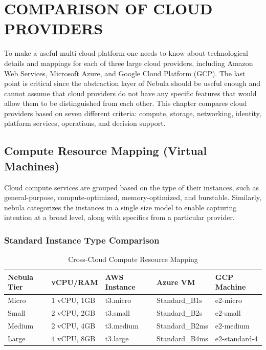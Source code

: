 \chapter{COMPARISON OF CLOUD PROVIDERS}
\thispagestyle{plain}

To make a useful multi-cloud platform one needs to know about technological details and mappings for each of three large cloud providers, including Amazon Web Services, Microsoft Azure, and Google Cloud Platform (GCP). The last point is critical since the abstraction layer of Nebula should be useful enough and cannot assume that cloud providers do not have any specific features that would allow them to be distinguished from each other. This chapter compares cloud providers based on seven different criteria: compute, storage, networking, identity, platform services, operations, and decision support.


\section{Compute Resource Mapping (Virtual Machines)}
Cloud compute services are grouped based on the type of their instances, such as general-purpose, compute-optimized, memory-optimized, and burstable. Similarly, nebula categorizes the instances in a single size model to enable capturing intention at a broad level, along with specifics from a particular provider.

\subsection{Standard Instance Type Comparison}
\begin{table}[H]
\centering
\caption{Cross-Cloud Compute Resource Mapping}
\label{tab:compute_mapping}
\begin{tabular}{|l|l|l|l|l|}
\hline
\textbf{Nebula Tier} & \textbf{vCPU/RAM} & \textbf{AWS Instance} & \textbf{Azure VM} & \textbf{GCP Machine} \\ \hline
Micro & 1 vCPU, 1GB & t3.micro & Standard\_B1s & e2-micro \\ \hline
Small & 2 vCPU, 2GB & t3.small & Standard\_B2s & e2-small \\ \hline
Medium & 2 vCPU, 4GB & t3.medium & Standard\_B2ms & e2-medium \\ \hline
Large & 4 vCPU, 8GB & t3.large & Standard\_B4ms & e2-standard-4 \\ \hline
\end{tabular}
\end{table}

